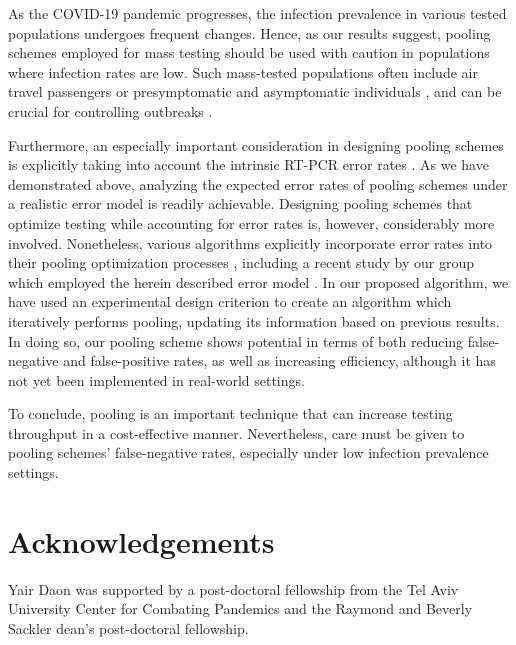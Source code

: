 \documentclass{article}
\begin{document}
As the COVID-19 pandemic progresses, the infection prevalence in
various tested populations undergoes frequent changes. Hence, as our
results suggest, pooling schemes employed for mass testing should be
used with caution in populations where infection rates are low. Such
mass-tested populations often include air travel passengers \cite{JTM}
or presymptomatic and asymptomatic individuals \cite{RobinHood}, and
can be crucial for controlling outbreaks \cite{MinaScience}.

Furthermore, an especially important consideration in designing
pooling schemes is explicitly taking into account the intrinsic RT-PCR error rates
. As we have demonstrated above, analyzing the expected
error rates of pooling schemes under a realistic error
model is readily achievable. Designing pooling schemes that optimize
testing while accounting for error rates is, however, considerably more involved.
Nonetheless, various algorithms explicitly incorporate error
rates into their pooling optimization processes \cite{Kim, OptimalDorfmanPool}, including a
recent study by our group which employed the herein described error
model \cite{DOPE}.  In our proposed algorithm, we have used an
experimental design criterion to create an algorithm which iteratively
performs pooling, updating its information based on previous
results. In doing so, our pooling scheme shows potential in terms of
both reducing false-negative and false-positive rates, as well as increasing efficiency,
although it has not yet been implemented in real-world settings.

To conclude, pooling is an important technique that can increase
testing throughput in a cost-effective manner. Nevertheless, care must
be given to pooling schemes' false-negative rates, especially under
low infection prevalence settings.

\section*{Acknowledgements}
Yair Daon was supported by a post-doctoral fellowship from the Tel
Aviv University Center for Combating Pandemics and the Raymond and
Beverly Sackler dean's post-doctoral fellowship.



\end{document}
